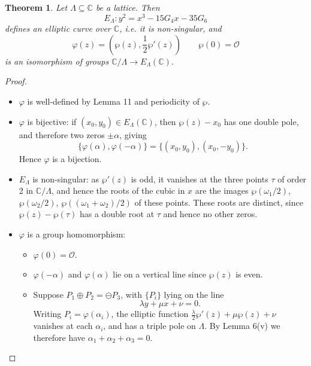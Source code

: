 \documentclass[a4paper]{article}
\theoremstyle{plain}
\newtheorem{theorem}{Theorem}
\theoremstyle{remark}
\theoremstyle{definition}
\renewcommand{\O}{\mathcal{O}}
\newcommand{\C}{\mathbb{C}}
\begin{document}
\begin{theorem}
    Let $\Lambda\subseteq\C$ be a lattice. Then
    \begin{equation*}
        E_\Lambda : y^2 = x^3 - 15G_4x - 35G_6
    \end{equation*}
    defines an elliptic curve over $\C$, i.e. it is non-singular, and
    \begin{equation*}
        \varphi(z) = (\wp(z),\frac{1}{2}\wp'(z)) \qquad \wp(0)=\O
    \end{equation*}
    is an isomorphism of groups $\C/\Lambda\to E_\Lambda(\C)$.
\end{theorem}

\begin{proof}
    \begin{itemize}
        \item $\varphi$ is well-defined by Lemma 11 and periodicity of $\wp$.

        \item $\varphi$ is bijective: if $(x_0,y_0)\in E_\Lambda(\C)$, then
            $\wp(z)-x_0$ has one double pole, and therefore two zeros
            $\pm\alpha$, giving
            \begin{equation*}
                \{\varphi(\alpha),\varphi(-\alpha)\} = \{(x_0,y_0),(x_0,-y_0)\}.
            \end{equation*}
            Hence $\varphi$ is a bijection.

        \item $E_\Lambda$ is non-singular: as $\wp'(z)$ is odd, it vanishes at
            the three points $\tau$ of order 2 in $\C/\Lambda$, and hence the
            roots of the cubic in $x$ are the images $\wp(\omega_1/2)$,
            $\wp(\omega_2/2)$, $\wp((\omega_1+\omega_2)/2)$ of these points.
            These roots are distinct, since $\wp(z)-\wp(\tau)$ has a double root
            at $\tau$ and hence no other zeros.

        \item $\varphi$ is a group homomorphism:
            \begin{itemize}
                \item $\varphi(0)=\O$.
                \item $\varphi(-\alpha)$ and $\varphi(\alpha)$ lie on a vertical
                    line since $\wp(z)$ is even.

                \item Suppose $P_1\oplus P_2=\ominus P_3$, with $\{P_i\}$ lying
                    on the line
                    \begin{equation*}
                        \lambda y + \mu x + \nu = 0.
                    \end{equation*}
                    Writing $P_i=\varphi(\alpha_i)$, the elliptic function
                    $\frac{\lambda}{2}\wp'(z)+\mu\wp(z)+\nu$ vanishes at each
                    $\alpha_i$, and has a triple pole on $\Lambda$. By Lemma
                    6(v) we therefore have $\alpha_1+\alpha_2+\alpha_3=0$.
            \end{itemize}
    \end{itemize}
\end{proof}
\end{document}
